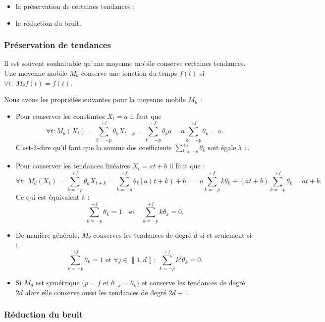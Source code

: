 \documentclass[
  12pt,
  french,
  12pt,a4paper]{article}
\newcommand\1{\mathds{1}}
\begin{document}
\begin{itemize}
\item
  la préservation de certaines tendances ;
\item
  la réduction du bruit.
\end{itemize}

\hypertarget{pruxe9servation-de-tendances}{%
\subsubsection{Préservation de tendances}\label{pruxe9servation-de-tendances}}

Il est souvent souhaitable qu'une moyenne mobile conserve certaines tendances.
Une moyenne mobile \(M_\theta\) conserve une fonction du temps \(f(t)\) si \(\forall t:\:M_\theta f(t)=f(t)\).

Nous avons les propriétés suivantes pour la moyenne mobile \(M_\theta\)~:

\begin{itemize}
\item
  Pour conserver les constantes \(X_t=a\) il faut que
  \[
  \forall t:M_\theta(X_t)=\sum_{k=-p}^{+f}\theta_kX_{t+k}=\sum_{k=-p}^{+f}\theta_ka=a\sum_{k=-p}^{+f}\theta_k=a.
  \]
  C'est-à-dire qu'il faut que la somme des coefficients \(\sum_{k=-p}^{+f}\theta_k\) soit égale à \(1\).
\item
  Pour conserver les tendances linéaires \(X_t=at+b\) il faut que :
  \[
  \forall t:\:M_\theta(X_t)=\sum_{k=-p}^{+f}\theta_kX_{t+k}=\sum_{k=-p}^{+f}\theta_k[a(t+k)+b]=a\sum_{k=-p}^{+f}k\theta_k+(at+b)\sum_{k=-p}^{+f}\theta_k=at+b.
  \]
  Ce qui est équivalent à :
  \[
  \sum_{k=-p}^{+f}\theta_k=1
  \quad\text{et}\quad
  \sum_{k=-p}^{+f}k\theta_k=0.
  \]
\item
  De manière générale, \(M_\theta\) conserves les tendances de degré \(d\) si et seulement si :
  \[
  \sum_{k=-p}^{+f}\theta_k=1
   \text{ et }
  \forall j \in \left\llbracket 1,d\right\rrbracket:\:
  \sum_{k=-p}^{+f}k^j\theta_k=0.
  \]
\item
  Si \(M_\theta\) est symétrique (\(p=f\) et \(\theta_{-k} = \theta_k\)) et conserve les tendances de degré \(2d\) alors elle conserve aussi les tendances de degré \(2d+1\).
\end{itemize}

\hypertarget{ruxe9duction-du-bruit}{%
\subsubsection{Réduction du bruit}\label{ruxe9duction-du-bruit}}
\end{document}
